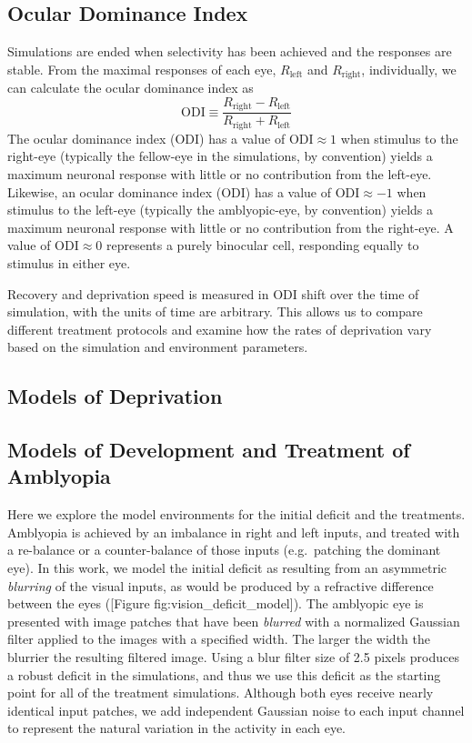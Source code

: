 \documentclass[
]{article}
\begin{document}
\subsection{Ocular Dominance Index}\label{sec:ocular-dominance-index}

Simulations are ended when selectivity has been achieved and the
responses are stable. From the maximal responses of each eye,
\(R_{\text{left}}\) and \(R_{\text{right}}\), individually, we can
calculate the ocular dominance index as \[
\text{ODI} \equiv \frac{R_{\text{right}}-R_{\text{left}}}{R_{\text{right}}+R_{\text{left}}}
\] The ocular dominance index (ODI) has a value of
\(\text{ODI} \approx 1\) when stimulus to the right-eye (typically the
fellow-eye in the simulations, by convention) yields a maximum neuronal
response with little or no contribution from the left-eye. Likewise, an
ocular dominance index (ODI) has a value of \(\text{ODI} \approx -1\)
when stimulus to the left-eye (typically the amblyopic-eye, by
convention) yields a maximum neuronal response with little or no
contribution from the right-eye. A value of \(\text{ODI} \approx 0\)
represents a purely binocular cell, responding equally to stimulus in
either eye.

Recovery and deprivation speed is measured in ODI shift over the time of
simulation, with the units of time are arbitrary. This allows us to
compare different treatment protocols and examine how the rates of
deprivation vary based on the simulation and environment parameters.

\subsection{Models of Deprivation}\label{sec:models-of-deprivation}

\subsection{Models of Development and Treatment of
Amblyopia}\label{sec:models-of-development-and-treatment-of-amblyopia}

Here we explore the model environments for the initial deficit and the
treatments. Amblyopia is achieved by an imbalance in right and left
inputs, and treated with a re-balance or a counter-balance of those
inputs (e.g.~patching the dominant eye). In this work, we model the
initial deficit as resulting from an asymmetric \emph{blurring} of the
visual inputs, as would be produced by a refractive difference between
the eyes ({[}Figure fig:vision\_deficit\_model{]}). The amblyopic eye is
presented with image patches that have been \emph{blurred} with a
normalized Gaussian filter applied to the images with a specified width.
The larger the width the blurrier the resulting filtered image. Using a
blur filter size of 2.5 pixels produces a robust deficit in the
simulations, and thus we use this deficit as the starting point for all
of the treatment simulations. Although both eyes receive nearly
identical input patches, we add independent Gaussian noise to each input
channel to represent the natural variation in the activity in each eye.
\end{document}
